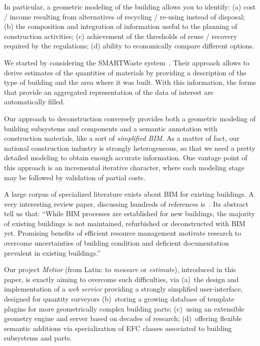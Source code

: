 In particular, a  geometric modeling of the building allows you to identify:
(a) cost / income resulting from alternatives of recycling / re-using instead of disposal;
(b) the composition and integration of information useful to the planning of construction activities;
(c) achievement of the thresholds of reuse / recovery required by the regulations;
(d) ability to economically compare different options.

We started by considering the SMARTWaste system~\cite{smartWaste}. Their approach allows to derive estimates of the quantities of materials by providing a description of the type of building and the area where it was built. With this information, the forms that provide an aggregated representation of the data of interest are automatically filled.

Our approach to deconstruction conversely provides both a geometric modeling of building subsystems and components and a semantic annotation with construction materials, like a sort of \emph{simplified BIM}. As a matter of fact, our national construction industry is strongly heterogeneous, so that  we need a pretty detailed modeling to obtain enough accurate information.
One vantage point of this approach is an incremental iterative character, where each modeling stage may be followed by validation of partial costs.

 
A large corpus of specialized literature exists about BIM for existing buildings. A very interesting review paper, discussing hundreds of references is~\cite{Volk2014109}. Its abstract tell us that:  ``While BIM processes are established for new buildings, the majority of existing buildings is not maintained, refurbished or deconstructed with BIM yet. Promising benefits of efficient resource management motivate research to overcome uncertainties of building condition and deficient documentation prevalent in existing buildings.''

Our project \emph{Metior} (from Latin: to  \emph{measure} or  \emph{estimate}), introduced in this paper, is exactly aiming to overcome such difficulties, via (a)~the design and implementation of a \emph{web service} providing a strongly simplified user-interface, designed for quantity surveyors (b)~storing a growing database of template plugins for more geometrically complex building parts; (c)~using an extensible geometry engine and server based on decades of research; (d)~offering flexible semantic additions via specialization of EFC classes associated to building subsystems and parts.



